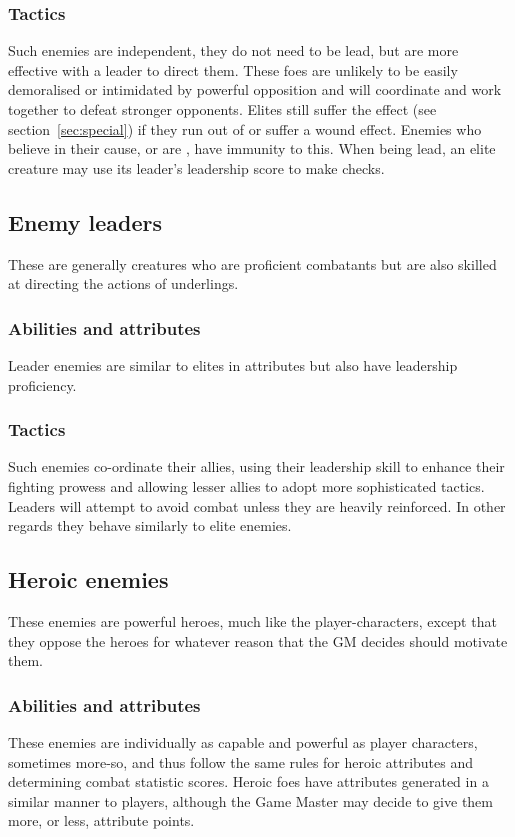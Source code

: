 \documentclass[a4paper,10pt,oneside]{book}
\newcommand{\textlf}[1]{\textbf{\titlecap{#1}}}
\begin{document}
\subsubsection{Tactics}
Such enemies are independent, they do not need to be lead, but are more effective with a leader to direct them. These foes are unlikely to be easily demoralised or intimidated by powerful opposition and will coordinate and work together to defeat stronger opponents. Elites still suffer the \textlf{panic} effect (see section~\ref{sec:special}) if they run out of \textlf{endurance} or suffer a wound effect. Enemies who believe in their cause, or are \textlf{mindless}, have immunity to this. When being lead, an elite creature may use its leader's leadership score to make \textlf{panic} checks.

\subsection{Enemy leaders}
These are generally creatures who are proficient combatants but are also skilled at directing the actions of underlings.
\subsubsection{Abilities and attributes}
Leader enemies are similar to elites in attributes but also have leadership proficiency.
\subsubsection{Tactics}
Such enemies co-ordinate their allies, using their leadership skill to enhance their fighting prowess and allowing lesser allies to adopt more sophisticated tactics. Leaders will attempt to avoid combat unless they are heavily reinforced. In other regards they behave similarly to elite enemies.

\subsection{Heroic enemies}
These enemies are powerful heroes, much like the player-characters, except that they oppose the heroes for whatever reason that the GM decides should motivate them.
\subsubsection{Abilities and attributes}
These enemies are individually as capable and powerful as player characters, sometimes more-so, and thus follow the same rules for heroic attributes and determining combat statistic scores. Heroic foes have attributes generated in a similar manner to players, although the Game Master may decide to give them more, or less, attribute points.
\end{document}
